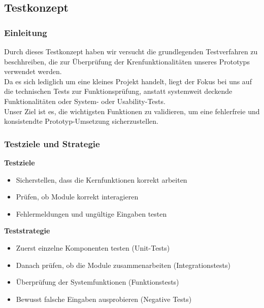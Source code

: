 \newpage
\subsection{Testkonzept}


\newcommand{\konzept}[4]{%
    \subsection*{titel}
    \vspace{0.3cm}
}

\subsubsection{Einleitung}

Durch dieses Testkonzept haben wir versucht die grundlegenden Testverfahren zu beschhreiben, die zur Überprüfung der Krenfunktionalitäten unseres Prototyps verwendet werden.\\
Da es sich lediglich um eine kleines Projekt handelt, liegt der Fokus bei uns auf die technischen Tests zur Funktionsprüfung, anstatt systemweit deckende Funktionalitäten oder System- oder Usability-Tests.\\
Unser Ziel ist es, die wichtigsten Funktionen zu validieren, um eine fehlerfreie und konsistendte Prototyp-Umsetzung sicherzustellen.

\subsubsection{Testziele und Strategie}

\textbf{Testziele}

\begin{itemize}
	\item Sicherstellen, dass die Kernfunktionen korrekt arbeiten
	\item Prüfen, ob Module korrekt interagieren
	\item Fehlermeldungen und ungültige Eingaben testen
\end{itemize}

\textbf{Teststrategie}

\begin{itemize}
	\item Zuerst einzelne Komponenten testen (Unit-Tests)
	\item Danach prüfen, ob die Module zusammenarbeiten (Integrationstests)
	\item Überprüfung der Systemfunktionen (Funktionstests)
	\item Bewusst falsche Eingaben ausprobieren (Negative Tests)
\end{itemize}

